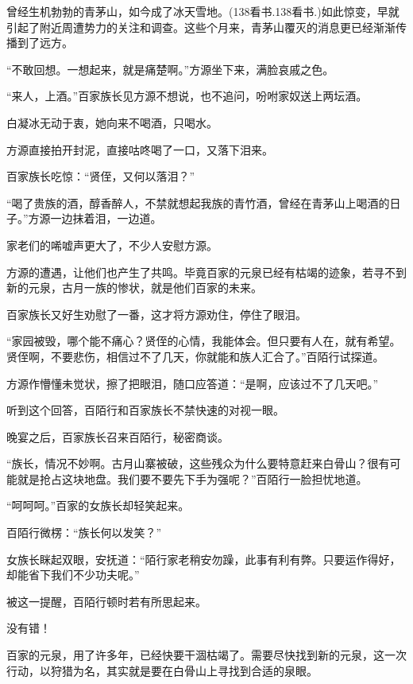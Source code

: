 
\begin{this_body}

曾经生机勃勃的青茅山，如今成了冰天雪地。(138看书.138看书.)如此惊变，早就引起了附近周遭势力的关注和调查。这些个月来，青茅山覆灭的消息更已经渐渐传播到了远方。

“不敢回想。一想起来，就是痛楚啊。”方源坐下来，满脸哀戚之色。

“来人，上酒。”百家族长见方源不想说，也不追问，吩咐家奴送上两坛酒。

白凝冰无动于衷，她向来不喝酒，只喝水。

方源直接拍开封泥，直接咕咚喝了一口，又落下泪来。

百家族长吃惊：“贤侄，又何以落泪？”

“喝了贵族的酒，醇香醉人，不禁就想起我族的青竹酒，曾经在青茅山上喝酒的日子。”方源一边抹着泪，一边道。

家老们的唏嘘声更大了，不少人安慰方源。

方源的遭遇，让他们也产生了共鸣。毕竟百家的元泉已经有枯竭的迹象，若寻不到新的元泉，古月一族的惨状，就是他们百家的未来。

百家族长又好生劝慰了一番，这才将方源劝住，停住了眼泪。

“家园被毁，哪个能不痛心？贤侄的心情，我能体会。但只要有人在，就有希望。贤侄啊，不要悲伤，相信过不了几天，你就能和族人汇合了。”百陌行试探道。

方源作懵懂未觉状，擦了把眼泪，随口应答道：“是啊，应该过不了几天吧。”

听到这个回答，百陌行和百家族长不禁快速的对视一眼。

晚宴之后，百家族长召来百陌行，秘密商谈。

“族长，情况不妙啊。古月山寨被破，这些残众为什么要特意赶来白骨山？很有可能就是抢占这块地盘。我们要不要先下手为强呢？”百陌行一脸担忧地道。

“呵呵呵。”百家的女族长却轻笑起来。

百陌行微楞：“族长何以发笑？”

女族长眯起双眼，安抚道：“陌行家老稍安勿躁，此事有利有弊。只要运作得好，却能省下我们不少功夫呢。”

被这一提醒，百陌行顿时若有所思起来。

没有错！

百家的元泉，用了许多年，已经快要干涸枯竭了。需要尽快找到新的元泉，这一次行动，以狩猎为名，其实就是要在白骨山上寻找到合适的泉眼。


\end{this_body}
